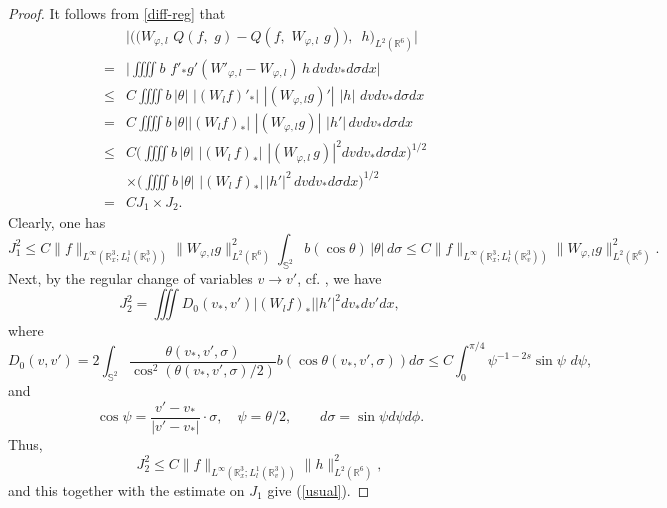 \documentclass{amsart}[12pt, article]
\begin{document}
\begin{proof}
It follows {}from \eqref{diff-reg} that
\begin{eqnarray*}
&&\Big|\Big(\big(W_{\varphi,l}\,\,Q(f,\,\,g)-Q(f,\,\,W_{\varphi,l}\,\, g)\big),\,\,\,
h\Big)_{L^2({{{\mathbb R}}}^6)}\Big| \\
&=&\Big|\iiiint
b\,  \,f'_* g'(W'_{\varphi, l}-W_{\varphi,l})\, h\, dv dv_* d\sigma dx\Big|\\
& \leq& C \iiiint  b\, |\theta|\,\,
|(W_{l} f)'_*|\,\,|(W_{\varphi,l}g)'|\,\,|h|\,\,dvdv_*d\sigma dx\\
& =&C\iiiint  b\, |\theta| |(W_{l}f)_*|\,\,
|(W_{\varphi, l}g)|\,\,|h'|\, dvdv_*d\sigma dx\\
& \leq& C \Big(\iiiint  b\, |\theta|\,\, |(W_{l}\,
 f)_*|\,\,|(W_{\varphi, l}\, g)|^2 dv dv_*
d\sigma dx \Big)^{1/2}\\
&&\times \Big(\iiiint  b\, |\theta|\,\, |(W_{l}\, f)_*|\,
|h'|^2\, dvdv_*d\sigma dx\Big)^{1/2}\\
 &=&C J_1 \times J_2.
\end{eqnarray*}
Clearly, one has
\[
J^2_1\leq C \|f\|_{L^\infty({{{\mathbb R}}}^3_x; L^1_{l}({{{\mathbb R}}}^3_v))}
\|W_{\varphi, l} g\|^2_{L^2({{{\mathbb R}}}^6)}\int_{{\mathbb{S}}^2}b(\cos\theta)\,|\theta|\, d\sigma \leq C
\|f\|_{L^\infty({{{\mathbb R}}}^3_x; L^1_{l}({{{\mathbb R}}}^3_v))}
\|W_{\varphi, l} g\|^2_{L^2({{{\mathbb R}}}^6)}.
\]
Next, by the regular change of variables $v\to v'$, cf.
\cite{al-1, al-3}, we have
\[
J^2_2=\iiint   D_0(v_*,v')|(W_{l}f)_*||h'|^2dv_*dv'dx,
\]
where
$$
D_0(v,v')=2\int_{{\mathbb{S}}^2} \frac{\theta(v_*, v',
\sigma)}{\cos^2(\theta(v_*, v', \sigma)/2)} b(\cos\theta(v_*,
v',\sigma))d\sigma \leq C\int_0^{\pi/4}\psi^{-1-2s}\sin\psi\,\,
d\psi,
$$
and
$$
\cos\psi=\frac{v'-v_*}{|v'-v_*|}\cdot \sigma, \quad \psi=\theta/2,
\qquad d\sigma=\sin\psi d\psi d\phi.
$$
Thus,
\[
J^2_2\leq C \|f\|_{L^\infty({{{\mathbb R}}}_x^3;L^1_{l}({{{\mathbb R}}}^3_v))}\|h\|^2_{L^2({{{\mathbb R}}}^6)},
\]
and this together with the estimate on
$J_1$ give (\ref{usual}).


\end{proof}
\end{document}

